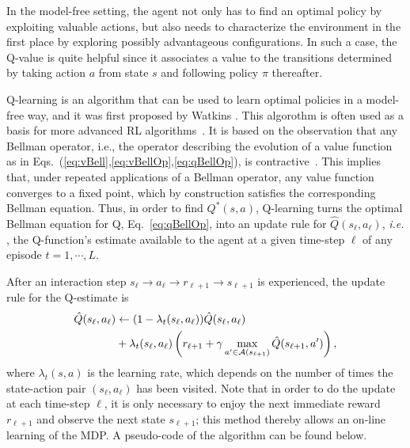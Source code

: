 In the model-free setting, the agent not only has to find an optimal policy by exploiting valuable actions, but also needs to characterize the environment in the first place by exploring possibly advantageous configurations. In such a case, the Q-value is quite helpful since it associates a value to the transitions determined by taking action $a$ from state $s$ and following policy $\pi$ thereafter.

Q-learning is an algorithm that can be used to learn optimal policies in a model-free way, and it was first proposed by Watkins \cite{Watkins1989}. This algorothm is often used as a basis for more advanced RL algorithms~\cite{Mnih2013, ddpg}.
It is based on the observation that any Bellman operator, i.e., the operator describing the evolution of a value function as in Eqs.~(\ref{eq:vBell},\ref{eq:vBellOp},\ref{eq:qBellOp}), is contractive~\cite{algsrl}. This implies that, under repeated applications of a Bellman operator, any value function converges to a fixed point, which by construction satisfies the corresponding Bellman equation. Thus, in order to find $Q^{*}(s,a)$, Q-learning turns the optimal Bellman equation for Q, Eq.~\eqref{eq:qBellOp}, into an update rule for $\hat{Q}(s_{\ell},a_{\ell})$, \textit{i.e.}
, the Q-function's estimate available to the agent at a given time-step $\ell$ of any episode $t=1,\cdots,L$.

After an interaction step $s_{\ell}\rightarrow a_{\ell}\rightarrow r_{\ell+1}\rightarrow s_{\ell+1}$ is experienced, the update rule for the Q-estimate is
\begin{align}\label{eq:QLUPDATERULE}
\hat{Q}(s_{\ell}, a_{\ell}) & \leftarrow (1-\lambda_t(s_{\ell},a_{\ell}))\hat{Q}(s_{\ell}, a_{\ell})\\
&+ \lambda_t(s_{\ell},a_{\ell}) \left(r_{\ell+1}  + \gamma \max_{a'\in\mathcal{A}(s_{\ell+1})}\hat{Q}(s_{\ell+1}, a')\right),
\end{align}
where $\lambda_t(s,a)$ is the learning rate, which depends on the number of times the state-action pair $(s_{\ell},a_{\ell})$ has been visited.
Note that in order to do the update at each time-step $\ell$, it is only necessary to enjoy the next immediate reward $r_{\ell+1}$ and observe the next state $s_{\ell+1}$; this method thereby allows an on-line learning of the MDP. A pseudo-code of the algorithm can be found below.

